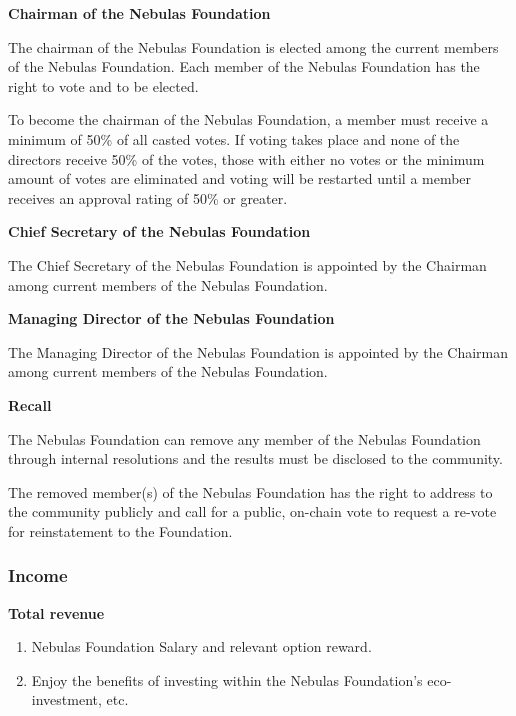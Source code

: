 \vspace{2em}

\textbf{Chairman of the Nebulas Foundation}

The chairman of the Nebulas Foundation is elected among the current members of the Nebulas Foundation. Each member of the Nebulas Foundation has the right to vote and to be elected.

To become the chairman of the Nebulas Foundation, a member must receive a minimum of 50\% of all casted votes. If voting takes place and none of the directors receive 50\% of the votes, those with either no votes or the minimum amount of votes are eliminated and voting will be restarted until a member receives an approval rating of 50\% or greater.

\vspace{2em}

\textbf{Chief Secretary of the Nebulas Foundation}

The Chief Secretary of the Nebulas Foundation is appointed by the Chairman among current members of the Nebulas Foundation.

\vspace{2em}

\textbf{Managing Director of the Nebulas Foundation}

The Managing Director of the Nebulas Foundation is appointed by the Chairman among current members of the Nebulas Foundation.

\vspace{2em}

\textbf{Recall}

The Nebulas Foundation can remove any member of the Nebulas Foundation through internal resolutions and the results must be disclosed to the community.

The removed member(s) of the Nebulas Foundation has the right to address to the community publicly and call for a public, on-chain vote to request a re-vote for reinstatement to the Foundation.

\subsubsection{Income}

\textbf{Total revenue}

\begin{enumerate}
	\item Nebulas Foundation Salary and relevant option reward.
    \item Enjoy the benefits of investing within the Nebulas Foundation’s eco-investment, etc.
\end{enumerate}

